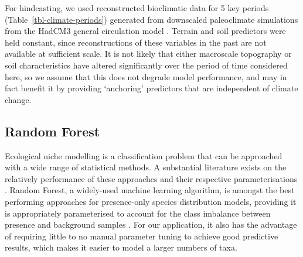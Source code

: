 \documentclass[
  authoryear,
  review]{elsarticle}
\begin{document}
\begin{table}

\caption{\label{tbl-climate-periods}}


\end{table}%

For hindcasting, we used reconstructed bioclimatic data for 5 key
periods (Table~\ref{tbl-climate-periods}) generated from downscaled
paleoclimate simulations from the HadCM3 general circulation model
\citep{BrownEtAl2018}. Terrain and soil predictors were held constant,
since reconstructions of these variables in the past are not available
at sufficient scale. It is not likely that either macroscale topography
or soil characteristics have altered significantly over the period of
time considered here, so we assume that this does not degrade model
performance, and may in fact benefit it by providing `anchoring'
predictors that are independent of climate change.

\subsection{Random Forest}\label{random-forest}

Ecological niche modelling is a classification problem that can be
approached with a wide range of statistical methods. A substantial
literature exists on the relatively performance of these approaches and
their respective parameterisations \citep[reviewed
in][]{ValaviEtAl2022}. Random Forest, a widely-used machine learning
algorithm, is amongst the best performing approaches for presence-only
species distribution models, providing it is appropriately parameterised
to account for the class imbalance between presence and background
samples \citep{ValaviEtAl2021, ValaviEtAl2022}. For our application, it
also has the advantage of requiring little to no manual parameter tuning
to achieve good predictive results, which makes it easier to model a
larger numbers of taxa.
\end{document}
